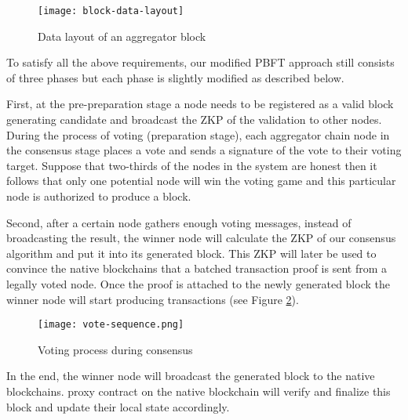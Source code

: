 \begin{figure}[!ht]
\begin{center}
\texttt{[image: block-data-layout]}
\end{center}
\caption{Data layout of an aggregator block}
\label{block-layout}
\end{figure}

To satisfy all the above requirements, our modified PBFT approach still consists of three phases but each phase is slightly modified as described below.

First, at the pre-preparation stage a node needs to be registered as a valid block generating candidate and broadcast the ZKP of the validation to other nodes. During the process of voting (preparation stage), each aggregator chain node in the consensus stage places a vote and sends a signature of the vote to their voting target. Suppose that two-thirds of the nodes in the system are honest then it follows that only one potential node will win the voting game and this particular node is authorized to produce a block.

Second, after a certain node gathers enough voting messages, instead of broadcasting the result, the winner node will calculate the ZKP of our consensus algorithm and put it into its generated block. This ZKP will later be used to convince the native blockchains that a batched transaction proof is sent from a legally voted node. Once the proof is attached to the newly generated block the winner node will start producing transactions (see Figure \ref{vote-sequence}).

\begin{figure}[!ht]
\texttt{[image: vote-sequence.png]}
\caption{Voting process during consensus}
\label{vote-sequence}
\end{figure}

In the end, the winner node will broadcast the generated block to the native blockchains. \dprotocol proxy contract on the native blockchain will verify and finalize this block and update their local state accordingly.

